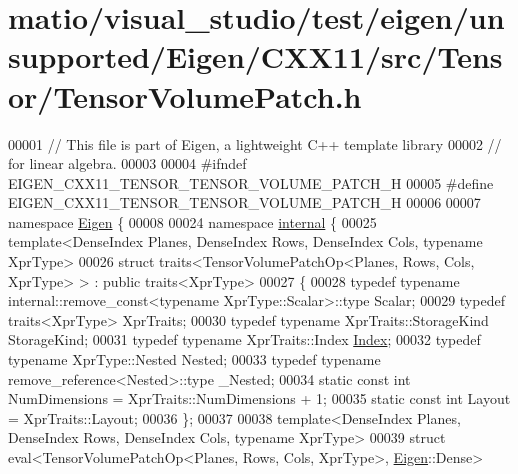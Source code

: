 \hypertarget{matio_2visual__studio_2test_2eigen_2unsupported_2_eigen_2_c_x_x11_2src_2_tensor_2_tensor_volume_patch_8h_source}{}\section{matio/visual\+\_\+studio/test/eigen/unsupported/\+Eigen/\+C\+X\+X11/src/\+Tensor/\+Tensor\+Volume\+Patch.h}
\label{matio_2visual__studio_2test_2eigen_2unsupported_2_eigen_2_c_x_x11_2src_2_tensor_2_tensor_volume_patch_8h_source}

\begin{DoxyCode}
00001 \textcolor{comment}{// This file is part of Eigen, a lightweight C++ template library}
00002 \textcolor{comment}{// for linear algebra.}
00003 
00004 \textcolor{preprocessor}{#ifndef EIGEN\_CXX11\_TENSOR\_TENSOR\_VOLUME\_PATCH\_H}
00005 \textcolor{preprocessor}{#define EIGEN\_CXX11\_TENSOR\_TENSOR\_VOLUME\_PATCH\_H}
00006 
00007 \textcolor{keyword}{namespace }\hyperlink{namespace_eigen}{Eigen} \{
00008 
00024 \textcolor{keyword}{namespace }\hyperlink{namespaceinternal}{internal} \{
00025 \textcolor{keyword}{template}<DenseIndex Planes, DenseIndex Rows, DenseIndex Cols, \textcolor{keyword}{typename} XprType>
00026 \textcolor{keyword}{struct }traits<TensorVolumePatchOp<Planes, Rows, Cols, XprType> > : \textcolor{keyword}{public} traits<XprType>
00027 \{
00028   \textcolor{keyword}{typedef} \textcolor{keyword}{typename} internal::remove\_const<typename XprType::Scalar>::type Scalar;
00029   \textcolor{keyword}{typedef} traits<XprType> XprTraits;
00030   \textcolor{keyword}{typedef} \textcolor{keyword}{typename} XprTraits::StorageKind StorageKind;
00031   \textcolor{keyword}{typedef} \textcolor{keyword}{typename} XprTraits::Index \hyperlink{namespace_eigen_a62e77e0933482dafde8fe197d9a2cfde}{Index};
00032   \textcolor{keyword}{typedef} \textcolor{keyword}{typename} XprType::Nested Nested;
00033   \textcolor{keyword}{typedef} \textcolor{keyword}{typename} remove\_reference<Nested>::type \_Nested;
00034   \textcolor{keyword}{static} \textcolor{keyword}{const} \textcolor{keywordtype}{int} NumDimensions = XprTraits::NumDimensions + 1;
00035   \textcolor{keyword}{static} \textcolor{keyword}{const} \textcolor{keywordtype}{int} Layout = XprTraits::Layout;
00036 \};
00037 
00038 \textcolor{keyword}{template}<DenseIndex Planes, DenseIndex Rows, DenseIndex Cols, \textcolor{keyword}{typename} XprType>
00039 \textcolor{keyword}{struct }eval<TensorVolumePatchOp<Planes, Rows, Cols, XprType>, \hyperlink{namespace_eigen}{Eigen}::Dense>

\end{DoxyCode}
